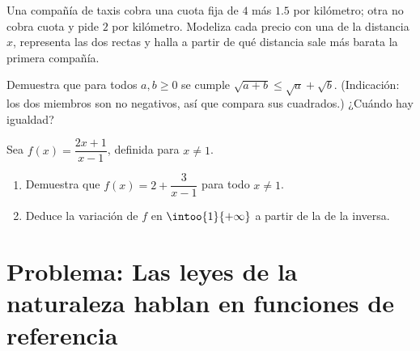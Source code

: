 \begin{exercise}[$\star\star$]\label{exo:g10:reffunc:8}
Una compañía de taxis cobra una cuota fija de $4$ más $1.5$ por
kilómetro; otra no cobra cuota y pide $2$ por kilómetro. Modeliza cada
precio con una  de la distancia $x$, representa las dos rectas
y halla a partir de qué distancia sale más barata la primera compañía.
\end{exercise}

\begin{exercise}[$\star\star$]\label{exo:g10:reffunc:9}
Demuestra que para todos $a, b \geq 0$ se cumple
$\sqrt{a + b} \leq \sqrt a + \sqrt b$. (Indicación: los dos miembros son
no negativos, así que compara sus cuadrados.) ¿Cuándo hay igualdad?
\end{exercise}

\begin{exercise}[$\star\star\star$]\label{exo:g10:reffunc:10}
Sea $f(x) = \dfrac{2x + 1}{x - 1}$, definida para $x \neq 1$.
\begin{enumerate}
  \item Demuestra que $f(x) = 2 + \dfrac{3}{x - 1}$ para todo $x \neq 1$.
  \item Deduce la variación de $f$ en $\intoo{1}{+\infty}$ a partir de la
        de la  inversa.
\end{enumerate}
\end{exercise}

\section{Problema: Las leyes de la naturaleza hablan en funciones de referencia}

